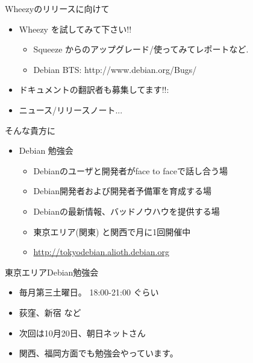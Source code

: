 \begin{frame}{Wheezyのリリースに向けて}

\begin{itemize}
  \item Wheezy を{\color{red}{是非}}試してみて下さい!!
  \begin{itemize}
    \item Squeeze からのアップグレード/使ってみてレポートなど.
    \item  Debian BTS: http://www.debian.org/Bugs/
  \end{itemize}
  \item ドキュメントの翻訳者も募集してます!!:
  \item ニュース/リリースノート...
\end{itemize}

\end{frame}

\begin{frame}[plain]

\begin{center}
\end{center}

\end{frame}


\begin{frame}{そんな貴方に}

\begin{itemize}
  \item Debian 勉強会
  \begin{itemize}
    \item Debianのユーザと開発者がface to faceで話し合う場
    \item Debian開発者および開発者予備軍を育成する場
    \item Debianの最新情報、バッドノウハウを提供する場
    \item 東京エリア(関東) と関西で月に1回開催中
    \item \url{http://tokyodebian.alioth.debian.org}
  \end{itemize}
\end{itemize}

\end{frame}

\begin{frame}{東京エリアDebian勉強会}

\begin{itemize}
  \item 毎月第三土曜日。 18:00-21:00 ぐらい
  \item 荻窪、新宿 など
  \item 次回は10月20日、朝日ネットさん
  \item 関西、福岡方面でも勉強会やっています。
\end{itemize}

\end{frame}

